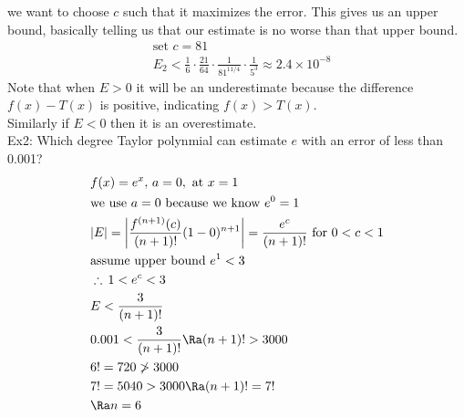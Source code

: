 we want to choose $c$ such that it maximizes the error. This gives us an upper bound, basically telling us that our estimate is no worse than that upper bound.
\begin{align*}
    &\text{set }c=81\\
    &E_2<\frac{1}{6}\cdot\frac{21}{64}\cdot\frac{1}{81^{11/4}}\cdot\frac{1}{5^3}\approx2.4\times10^{-8}
\end{align*}
Note that when $E>0$ it will be an underestimate because the difference $f(x)-T(x)$ is positive, indicating $f(x)>T(x)$.\\
Similarly if $E<0$ then it is an overestimate.\\
Ex2: Which degree Taylor polynmial can estimate $e$ with an error of less than 0.001?
\begin{align*}
    &f(x)=e^x,\,a=0,\text{ at $x=1$}\\
    &\text{we use $a=0$ because we know $e^0=1$}\\
    &|E|=\left|\frac{f^{(n+1)}(c)}{(n+1)!}(1-0)^{n+1}\right|=\frac{e^c}{(n+1)!}\text{ for $0<c<1$}\\
    &\text{assume upper bound $e^1<3$}\\
    &\therefore\,1<e^c<3\\
    &E<\frac{3}{(n+1)!}\\
    &0.001<\frac{3}{(n+1)!}\Ra (n+1)!>3000\\
    &6!=720\ngtr 3000\\
    &7!=5040>3000\Ra (n+1)!=7!\\
    &\Ra n=6
\end{align*}
